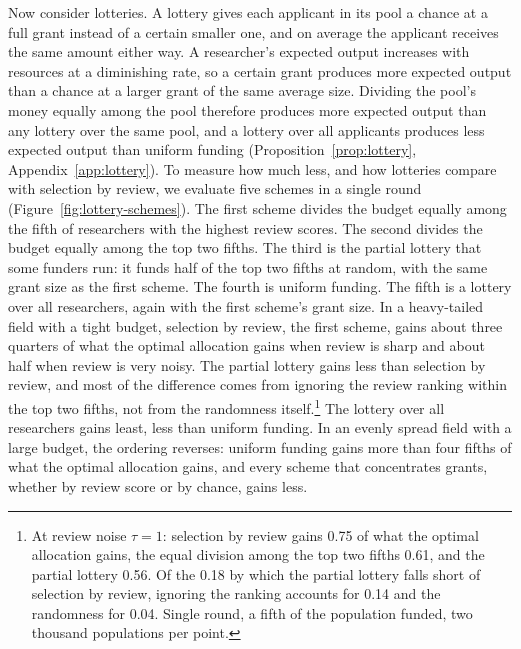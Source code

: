 \documentclass[article, 11pt, reqno]{amsart}
\theoremstyle{named}
\begin{document}
Now consider lotteries. A lottery gives each applicant in its pool a chance at a full grant instead of a certain smaller one, and on average the applicant receives the same amount either way. A researcher's expected output increases with resources at a diminishing rate, so a certain grant produces more expected output than a chance at a larger grant of the same average size. Dividing the pool's money equally among the pool therefore produces more expected output than any lottery over the same pool, and a lottery over all applicants produces less expected output than uniform funding (Proposition~\ref{prop:lottery}, Appendix~\ref{app:lottery}). To measure how much less, and how lotteries compare with selection by review, we evaluate five schemes in a single round (Figure~\ref{fig:lottery-schemes}). The first scheme divides the budget equally among the fifth of researchers with the highest review scores. The second divides the budget equally among the top two fifths. The third is the partial lottery that some funders run: it funds half of the top two fifths at random, with the same grant size as the first scheme. The fourth is uniform funding. The fifth is a lottery over all researchers, again with the first scheme's grant size. In a heavy-tailed field with a tight budget, selection by review, the first scheme, gains about three quarters of what the optimal allocation gains when review is sharp and about half when review is very noisy. The partial lottery gains less than selection by review, and most of the difference comes from ignoring the review ranking within the top two fifths, not from the randomness itself.\footnote{At review noise $\tau = 1$: selection by review gains 0.75 of what the optimal allocation gains, the equal division among the top two fifths 0.61, and the partial lottery 0.56. Of the 0.18 by which the partial lottery falls short of selection by review, ignoring the ranking accounts for 0.14 and the randomness for 0.04. Single round, a fifth of the population funded, two thousand populations per point.} The lottery over all researchers gains least, less than uniform funding. In an evenly spread field with a large budget, the ordering reverses: uniform funding gains more than four fifths of what the optimal allocation gains, and every scheme that concentrates grants, whether by review score or by chance, gains less.


\end{document}

